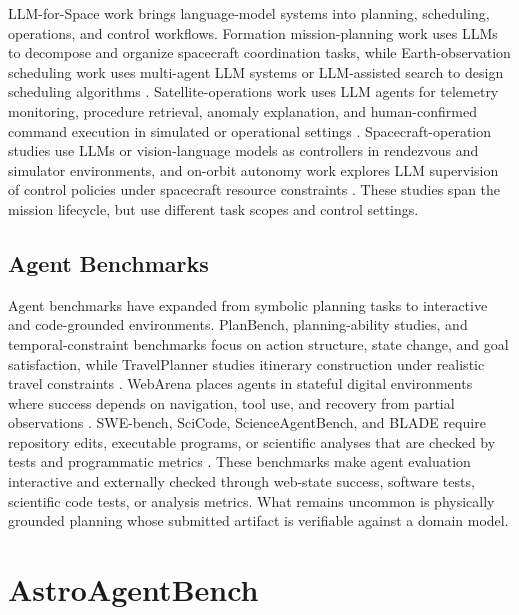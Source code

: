 \documentclass[]{mosi}
\begin{document}
LLM-for-Space work brings language-model systems into planning, scheduling, operations, and control workflows. Formation mission-planning work uses LLMs to decompose and organize spacecraft coordination tasks, while Earth-observation scheduling work uses multi-agent LLM systems or LLM-assisted search to design scheduling algorithms \citep{zhang2025large,chen2025large,evalns_2026_llm_satellite_scheduling}. Satellite-operations work uses LLM agents for telemetry monitoring, procedure retrieval, anomaly explanation, and human-confirmed command execution in simulated or operational settings \citep{campanelli_2025_llm_satellite_ops,esa_2024_a2i_roadmap}. Spacecraft-operation studies use LLMs or vision-language models as controllers in rendezvous and simulator environments, and on-orbit autonomy work explores LLM supervision of control policies under spacecraft resource constraints \citep{carrasco2025large,mousist_2025_astrea}. These studies span the mission lifecycle, but use different task scopes and control settings.

\subsection{Agent Benchmarks}

Agent benchmarks have expanded from symbolic planning tasks to interactive and code-grounded environments. PlanBench, planning-ability studies, and temporal-constraint benchmarks focus on action structure, state change, and goal satisfaction, while TravelPlanner studies itinerary construction under realistic travel constraints \citep{valmeekam2023planning,valmeekam2023planbench,ding2025tcp,xie2024travelplanner}. WebArena places agents in stateful digital environments where success depends on navigation, tool use, and recovery from partial observations \citep{zhouwebarena}. SWE-bench, SciCode, ScienceAgentBench, and BLADE require repository edits, executable programs, or scientific analyses that are checked by tests and programmatic metrics \citep{jimenezswe,scicode_2024,scienceagentbench_2025,gu2024blade}. These benchmarks make agent evaluation interactive and externally checked through web-state success, software tests, scientific code tests, or analysis metrics. What remains uncommon is physically grounded planning whose submitted artifact is verifiable against a domain model.

\section{AstroAgentBench}
\label{sec:benchmark}
\end{document}
